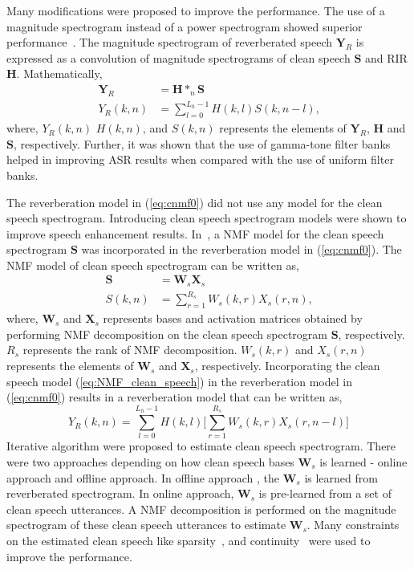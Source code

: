 Many modifications were proposed to improve the performance. The use of a magnitude spectrogram instead of a power spectrogram showed superior performance~\cite{Kumar2011}. The magnitude spectrogram of reverberated speech $\mathbf{Y}_R$ is expressed as a convolution of magnitude spectrograms of clean speech $\mathbf{S}$ and RIR $\mathbf{H}$. Mathematically,
\begin{align}
\mathbf{Y}_R&=\mathbf{H}*_n\mathbf{S} \nonumber \\
Y_R(k,n)& = \sum_{l=0}^{L_h-1} H(k,l)S(k,n-l) \text{,}
\label{eq:cnmf0}
\end{align}
where, $Y_R(k,n)$ $H(k,n)$, and $S(k,n)$ represents the elements of $\mathbf{Y}_R$, $\mathbf{H}$ and $\mathbf{S}$, respectively. Further, it was shown that the use of gamma-tone filter banks helped in improving ASR results when compared with the use of uniform filter banks. 

The reverberation model in (\ref{eq:cnmf0}) did not use any model for the clean speech spectrogram. Introducing clean speech spectrogram models were shown to improve speech enhancement results.  In~\cite{mohammadiha2016speech, Mohammadiha2015}, a NMF model for the clean speech spectrogram $\mathbf{S}$ was incorporated in the reverberation model in (\ref{eq:cnmf0}). The NMF model of clean speech spectrogram can be written as,
\begin{align}
\mathbf{S}&= \mathbf{W}_s\mathbf{X}_s \nonumber \\
S(k,n)    &= \sum_{r=1}^{R_s} W_s(k,r)X_s(r,n)\text{,}
\label{eq:NMF_clean_speech}
\end{align}
where, $\mathbf{W}_s$ and $\mathbf{X}_s$ represents bases and activation matrices obtained by performing NMF decomposition on the clean speech spectrogram $
\mathbf{S}$, respectively. $R_s$ represents the rank of NMF decomposition. $W_s(k,r)$ and $X_s(r,n)$ represents the elements of $\mathbf{W}_s$ and $\mathbf{X}_s$, respectively. Incorporating the clean speech model (\ref{eq:NMF_clean_speech}) in the reverberation model in (\ref{eq:cnmf0}) results in a reverberation model that can be written as,
\begin{equation}
Y_R(k,n) = \sum_{l=0}^{L_h-1} H(k,l) \bigg[ \sum_{r=1}^{R_s} W_s(k,r) X_s(r,n-l) \bigg]
\label{eq:cnmf1}
\end{equation}
Iterative algorithm were proposed to estimate clean speech spectrogram. There were two approaches depending on how clean speech bases $\mathbf{W}_s$ is learned - online approach and offline approach. In offline approach , the $\mathbf{W}_s$ is learned from reverberated spectrogram. In online approach, $\mathbf{W}_s$ is pre-learned from a set of clean speech utterances. A NMF decomposition is performed on the magnitude spectrogram of these clean speech utterances to estimate $\mathbf{W}_s$. Many constraints on the estimated clean speech like sparsity~\cite{mohammadiha2016speech, Mohammadiha2015}, and continuity~\cite{wager2018collaborative} were used to improve the performance. 

